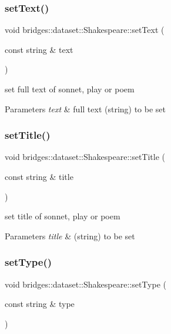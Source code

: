 \subsubsection{\texorpdfstring{set\+Text()}{setText()}}
{\footnotesize\ttfamily void bridges\+::dataset\+::\+Shakespeare\+::set\+Text (\begin{DoxyParamCaption}\item[{const string \&}]{text }\end{DoxyParamCaption})\hspace{0.3cm}{\ttfamily [inline]}}

set full text of sonnet, play or poem 
\begin{DoxyParams}{Parameters}
{\em text} & full text (string) to be set \\
\hline
\end{DoxyParams}
\mbox{\label{classbridges_1_1dataset_1_1_shakespeare_a92c11a229b38913fea73cfe26474587b}} 
\subsubsection{\texorpdfstring{set\+Title()}{setTitle()}}
{\footnotesize\ttfamily void bridges\+::dataset\+::\+Shakespeare\+::set\+Title (\begin{DoxyParamCaption}\item[{const string \&}]{title }\end{DoxyParamCaption})\hspace{0.3cm}{\ttfamily [inline]}}

set title of sonnet, play or poem 
\begin{DoxyParams}{Parameters}
{\em title} & (string) to be set \\
\hline
\end{DoxyParams}
\mbox{\label{classbridges_1_1dataset_1_1_shakespeare_a4e9d1126524d2b10f5fe36ffd4588f15}} 
\subsubsection{\texorpdfstring{set\+Type()}{setType()}}
{\footnotesize\ttfamily void bridges\+::dataset\+::\+Shakespeare\+::set\+Type (\begin{DoxyParamCaption}\item[{const string \&}]{type }\end{DoxyParamCaption})\hspace{0.3cm}{\ttfamily [inline]}}

